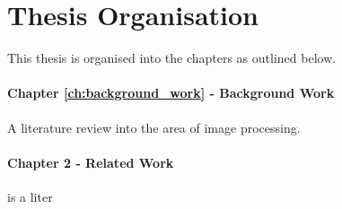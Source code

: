 \section{Thesis Organisation}

This thesis is organised into the chapters as outlined below.


\paragraph{Chapter \ref{ch:background_work} - Background Work} A literature review into the area of image processing.

\paragraph{Chapter 2 - Related Work} is a liter